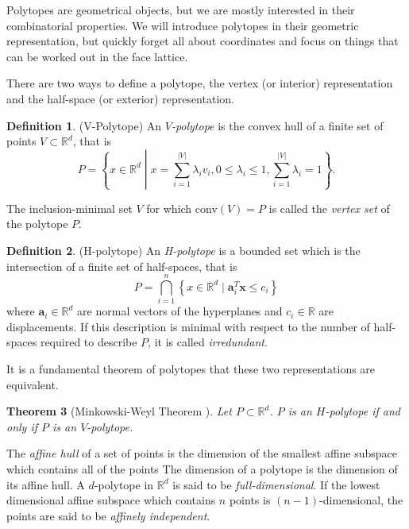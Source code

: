 \documentclass[a4paper,12pt]{book}
\theoremstyle{plain}
\newtheorem{theorem}{Theorem}[section]
\theoremstyle{definition}
\newtheorem{definition}[theorem]{Definition}
\begin{document}
Polytopes are geometrical objects, but we are mostly interested in their combinatorial properties.
We will introduce polytopes in their geometric representation, but quickly forget all about coordinates
and focus on things that can be worked out in the face lattice.

There are two ways to define a polytope, the vertex (or interior) representation and the 
half-space (or exterior) representation.

\begin{definition}
(V-Polytope) An \emph{$V$-polytope} is the convex hull of a finite set of points $V 
\subset \mathbb{R}^d$, that is 
\begin{equation}
 P = \left\{x\in \mathbb{R}^d \middle| x = \sum_{i=1}^{|V|} \lambda_i v_i, 
0\leq \lambda_i \leq 1, \sum_{i=1}^{|V|} \lambda_i = 1 \right\}.
\end{equation}

The inclusion-minimal set $V$ for which conv$(V) = P$ is called the
\emph{vertex set} of the polytope $P$. 

\end{definition}

\begin{definition}
 (H-polytope) An \emph{H-polytope} is a bounded set which is the intersection of a finite set of 
half-spaces, that is
\begin{equation}
 P = \bigcap_{i=1}^n \left\{x \in \mathbb{R}^d \mid \mathbf{a}_i^T \mathbf{x} 
\leq 
c_i \right\}
\end{equation}
where $\mathbf{a}_i \in \mathbb{R}^d$ are normal vectors of the hyperplanes and 
$c_i \in 
\mathbb{R}$ are displacements. If this description is minimal with respect to 
the number of half-spaces required to describe $P$, it is called 
\textit{irredundant}.
\end{definition}

It is a fundamental theorem of polytopes that these two representations are 
equivalent.
\begin{theorem}[Minkowski-Weyl Theorem {\cite[Thm. 1.1.]{PolyLec}}] Let $P \subset \mathbb{R}^d$. 
$P$ is an $H$-polytope if and only if $P$ is an $V$-polytope.
\end{theorem}
The \textit{affine hull} of a set of points is the dimension of the smallest affine subspace which 
contains all of the points The dimension of a polytope is the dimension of its affine hull. 
A $d$-polytope in $\mathbb{R}^d$ is said to be 
\textit{full-dimensional}. If the lowest dimensional affine subspace which contains 
$n$ points is $(n-1)$-dimensional, the points are said to be \textit{affinely 
independent}.
\end{document}
